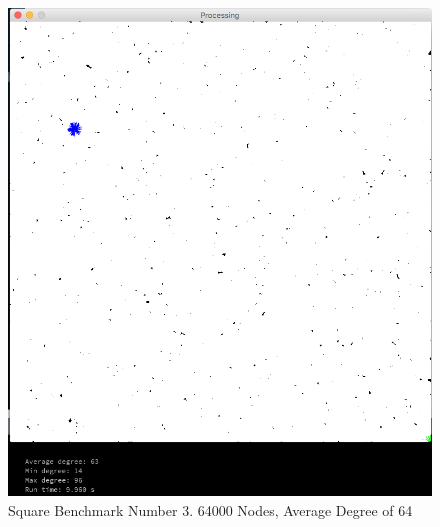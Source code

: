 \documentclass{article}
\begin{document}
\begin{center}
    \begin{figure}
        \includegraphics[scale=0.45]{./images/square_3.png}
        \caption{Square Benchmark Number 3. 64000 Nodes, Average Degree of 64}
        \label{square3}
    \end{figure}
\end{center}
\end{document}
